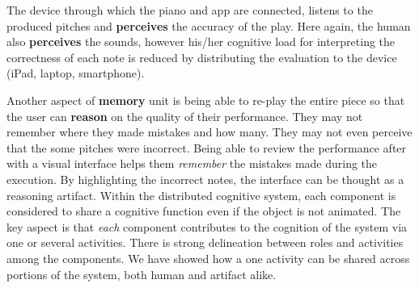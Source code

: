 \documentclass[12pt,letterpaper]{article}
\begin{document}
The device through which the piano and app are connected, listens to the produced pitches and \textbf{perceives} the accuracy of the play. Here again, the human also \textbf{perceives} the sounds, however his/her cognitive load for interpreting the correctness of each note is reduced by distributing the evaluation to the device (iPad, laptop, smartphone). 

Another aspect of \textbf{memory} unit is being able to re-play the entire piece so that the user can \textbf{reason} on the quality of their performance. They may not remember where they made mistakes and how many. They may not even perceive that the some pitches were incorrect. Being able to review the performance after with a visual interface helps them \textit{remember} the mistakes made during the execution. By highlighting the incorrect notes, the interface can be thought as a reasoning artifact. Within the distributed cognitive system, each component is considered to share a cognitive function even if the object is not animated. The key aspect is that \textit{each} component contributes to the cognition of the system via one or several activities. There is strong delineation between roles and activities among the components. We have showed how a one activity can be shared across portions of the system, both human and artifact alike. 

 

\end{document}
